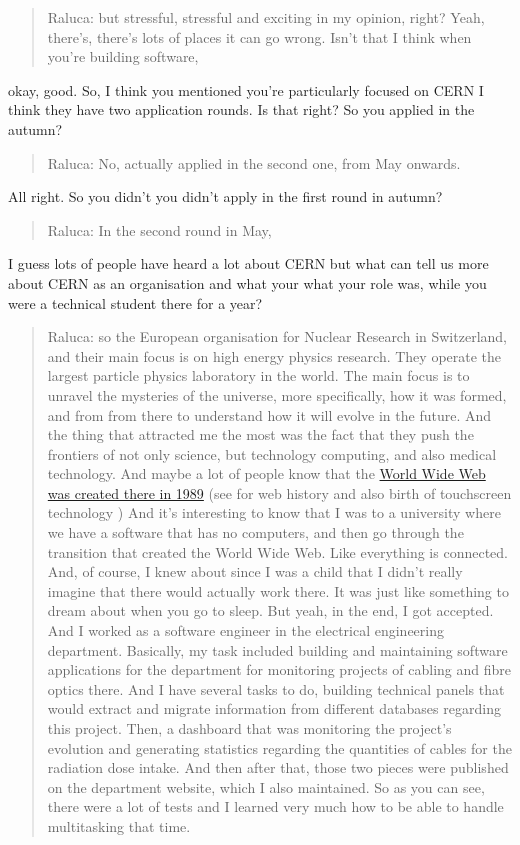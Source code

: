 \documentclass[
]{book}
\begin{document}
\begin{quote}
Raluca: but stressful, stressful and exciting in my opinion, right? Yeah, there's, there's lots of places it can go wrong. Isn't that I think when you're building software,
\end{quote}

okay, good. So, I think you mentioned you're particularly focused on CERN I think they have two application rounds. Is that right? So you applied in the autumn?

\begin{quote}
Raluca: No, actually applied in the second one, from May onwards.
\end{quote}

All right. So you didn't you didn't apply in the first round in autumn?

\begin{quote}
Raluca: In the second round in May,
\end{quote}

I guess lots of people have heard a lot about CERN but what can tell us more about CERN as an organisation and what your what your role was, while you were a technical student there for a year?

\begin{quote}
Raluca: so the European organisation for Nuclear Research in Switzerland, and their main focus is on high energy physics research. They operate the largest particle physics laboratory in the world. The main focus is to unravel the mysteries of the universe, more specifically, how it was formed, and from from there to understand how it will evolve in the future. And the thing that attracted me the most was the fact that they push the frontiers of not only science, but technology computing, and also medical technology. And maybe a lot of people know that the \href{https://home.cern/science/computing/where-web-was-born}{World Wide Web was created there in 1989} (see \citep{cailliau} for web history and also birth of touchscreen technology \citep{stumpe}) And it's interesting to know that I was to a university where we have a software that has no computers, and then go through the transition that created the World Wide Web. Like everything is connected. And, of course, I knew about since I was a child that I didn't really imagine that there would actually work there. It was just like something to dream about when you go to sleep. But yeah, in the end, I got accepted. And I worked as a software engineer in the electrical engineering department. Basically, my task included building and maintaining software applications for the department for monitoring projects of cabling and fibre optics there. And I have several tasks to do, building technical panels that would extract and migrate information from different databases regarding this project. Then, a dashboard that was monitoring the project's evolution and generating statistics regarding the quantities of cables for the radiation dose intake. And then after that, those two pieces were published on the department website, which I also maintained. So as you can see, there were a lot of tests and I learned very much how to be able to handle multitasking that time.
\end{quote}
\end{document}
